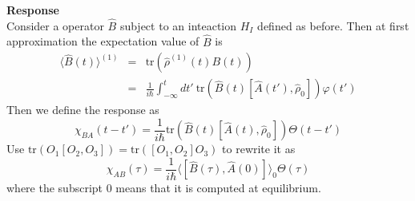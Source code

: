 \documentclass[12pt,a4paper]{article}
\newcommand{\integral}[3]{\int_{#1}^{#2} d #3 \ } %
\newcommand{\tr}{\text{tr}}
\begin{document}
\textbf{Response}\\
Consider a operator $\hat{B}$ subject to an inteaction $H_I$ defined as before. Then at  first approximation the expectation value of $\hat{B}$ is
\begin{eqnarray}
	  \langle \hat{B}(t) \rangle^{(1)} & = & \text{tr}\left(\hat{\rho}^{(1)}(t                                                                                                                                                                                    )B(t)\right) \\
	  & = & \frac{1}{i\hbar}\integral{-\infty}{t}{t'}\text{tr}\left(\hat{B}(t)[\hat{A}(t'),\hat{\rho}_0]\right)\varphi(t')
\end{eqnarray}
Then we define the response as
\begin{equation}
	\chi_{BA}(t-t') = \frac{1}{i\hbar} \text{tr}\left(\hat{B}(t)[\hat{A}(t),\hat{\rho}_0]\right) \Theta(t-t')
\end{equation}
Use $\tr \left(O_1 [O_2,O_3] \right) = \tr \left([O_1,O_2]O_3 \right)$ to rewrite it as
\begin{equation}
\chi_{AB}(\tau) = \frac{1}{i\hbar}\langle [\hat{B}(\tau),\hat{A}(0)]\rangle_0 \Theta(\tau)
\end{equation}
where the subscript 0 means that it is computed at equilibrium.
\end{document}

